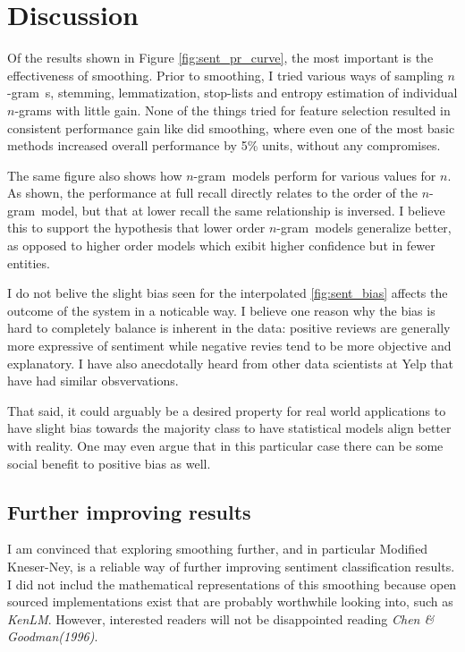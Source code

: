 \documentclass[a4paper,11pt]{kth-mag}
\newcommand{\ngram}{$n$-gram}
\newcommand{\ysc}{Modified Kneser-Ney classifier}
\begin{document}
\newpage
\section{Discussion}
Of the results shown in Figure \ref{fig:sent_pr_curve}, the most important 
is the effectiveness of smoothing.
Prior to smoothing, I tried various ways of sampling \ngram~s, stemming, lemmatization, stop-lists and entropy estimation of individual \ngram s with little gain. None of the things tried for feature selection resulted in consistent performance gain like did smoothing, where even one of the most basic methods increased overall performance by 5\% units, without any compromises.

The same figure also shows how \ngram~models perform for various values for $n$.
As shown, the performance at full recall directly relates to the order of the
\ngram~model, but that at lower recall the same relationship is inversed. I believe this
to support the hypothesis that lower order \ngram~models generalize better, as opposed to higher order
models which exibit higher confidence but in fewer entities.



I do not belive the slight bias seen for the interpolated \ref{fig:sent_bias} affects the outcome of the
system in a noticable way. I believe one reason why the bias is hard to completely balance is inherent in the data:
positive reviews are generally more expressive of sentiment while negative revies tend to be more objective and
explanatory. I have also anecdotally heard from other data scientists at Yelp that have had similar obsvervations.

That said, it could arguably be a desired property for real world applications to have slight bias towards the majority class
to have statistical models align better with reality. One may even argue that in this particular case there can be some social benefit to positive bias as well.


\subsection{Further improving results}
I am convinced that exploring smoothing further, and in particular Modified Kneser-Ney,
is a reliable way of further improving sentiment classification results. I did not includ the
mathematical representations of this smoothing because open sourced implementations exist
that are probably worthwhile looking into, such as \emph{KenLM}\cite{kenlm}. However, interested readers will not
be disappointed reading \emph{Chen \& Goodman(1996)}\cite{chen_goodman}.
\end{document}
